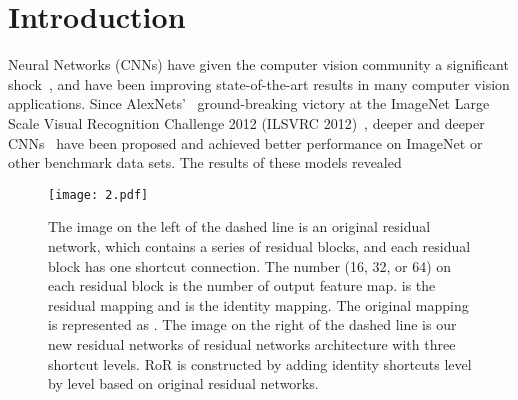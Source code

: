 \documentclass[journal]{IEEEtran}
\begin{document}
\section{Introduction}
 Neural Networks (CNNs) have given the computer vision community a significant shock~\cite{lecun2015deeplearning}, and have been improving state-of-the-art results in many computer vision applications. Since AlexNets'~\cite{Krizhenvshky2012dcn} ground-breaking victory at the ImageNet Large Scale Visual Recognition Challenge 2012 (ILSVRC 2012)~\cite{Russ2014imagenetchallenge}, deeper and deeper CNNs~\cite{Krizhenvshky2012dcn,miao2014detection,lin2013NiN,sermanet2013overfeat,simonyan2014vgg,romero2014fitnets,lee2015dsn,springgenberg2014allcnn,szegedy2015googlenet,he2015resnets} have been proposed and achieved better performance on ImageNet or other benchmark data sets. The results of these models revealed 
\begin{figure}
\centering
\texttt{[image: 2.pdf]}
\caption{The image on the left of the dashed line is an original residual network, which contains a series of residual blocks, and each residual block has one shortcut connection. The number (16, 32, or 64) on each residual block is the number of output feature map.  is the residual mapping and  is the identity mapping. The original mapping is represented as . The image on the right of the dashed line is our new residual networks of residual networks architecture with three shortcut levels. RoR is constructed by adding identity shortcuts level by level based on original residual networks.}
\label{fig:basicnetworks}
\end{figure}
\end{document}
